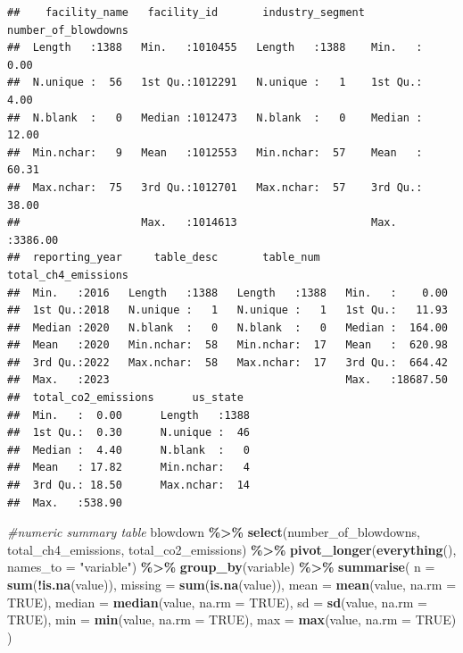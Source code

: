 \documentclass[
]{article}
\newenvironment{Shaded}{\begin{snugshade}}{\end{snugshade}}
\newcommand{\AttributeTok}[1]{\textcolor[rgb]{0.13,0.29,0.53}{#1}}
\newcommand{\CommentTok}[1]{\textcolor[rgb]{0.56,0.35,0.01}{\textit{#1}}}
\newcommand{\ConstantTok}[1]{\textcolor[rgb]{0.56,0.35,0.01}{#1}}
\newcommand{\FunctionTok}[1]{\textcolor[rgb]{0.13,0.29,0.53}{\textbf{#1}}}
\newcommand{\NormalTok}[1]{#1}
\newcommand{\SpecialCharTok}[1]{\textcolor[rgb]{0.81,0.36,0.00}{\textbf{#1}}}
\newcommand{\StringTok}[1]{\textcolor[rgb]{0.31,0.60,0.02}{#1}}
\begin{document}
\begin{verbatim}
##    facility_name   facility_id       industry_segment number_of_blowdowns
##  Length   :1388   Min.   :1010455   Length   :1388    Min.   :   0.00    
##  N.unique :  56   1st Qu.:1012291   N.unique :   1    1st Qu.:   4.00    
##  N.blank  :   0   Median :1012473   N.blank  :   0    Median :  12.00    
##  Min.nchar:   9   Mean   :1012553   Min.nchar:  57    Mean   :  60.31    
##  Max.nchar:  75   3rd Qu.:1012701   Max.nchar:  57    3rd Qu.:  38.00    
##                   Max.   :1014613                     Max.   :3386.00    
##  reporting_year     table_desc       table_num    total_ch4_emissions
##  Min.   :2016   Length   :1388   Length   :1388   Min.   :    0.00   
##  1st Qu.:2018   N.unique :   1   N.unique :   1   1st Qu.:   11.93   
##  Median :2020   N.blank  :   0   N.blank  :   0   Median :  164.00   
##  Mean   :2020   Min.nchar:  58   Min.nchar:  17   Mean   :  620.98   
##  3rd Qu.:2022   Max.nchar:  58   Max.nchar:  17   3rd Qu.:  664.42   
##  Max.   :2023                                     Max.   :18687.50   
##  total_co2_emissions      us_state   
##  Min.   :  0.00      Length   :1388  
##  1st Qu.:  0.30      N.unique :  46  
##  Median :  4.40      N.blank  :   0  
##  Mean   : 17.82      Min.nchar:   4  
##  3rd Qu.: 18.50      Max.nchar:  14  
##  Max.   :538.90
\end{verbatim}

\begin{Shaded}
\begin{Highlighting}[]
\CommentTok{\#numeric summary table}
\NormalTok{blowdown }\SpecialCharTok{\%\textgreater{}\%}
  \FunctionTok{select}\NormalTok{(number\_of\_blowdowns, total\_ch4\_emissions, total\_co2\_emissions) }\SpecialCharTok{\%\textgreater{}\%}
  \FunctionTok{pivot\_longer}\NormalTok{(}\FunctionTok{everything}\NormalTok{(), }\AttributeTok{names\_to =} \StringTok{"variable"}\NormalTok{) }\SpecialCharTok{\%\textgreater{}\%}
  \FunctionTok{group\_by}\NormalTok{(variable) }\SpecialCharTok{\%\textgreater{}\%}
  \FunctionTok{summarise}\NormalTok{(}
    \AttributeTok{n       =} \FunctionTok{sum}\NormalTok{(}\SpecialCharTok{!}\FunctionTok{is.na}\NormalTok{(value)),}
    \AttributeTok{missing =} \FunctionTok{sum}\NormalTok{(}\FunctionTok{is.na}\NormalTok{(value)),}
    \AttributeTok{mean    =} \FunctionTok{mean}\NormalTok{(value, }\AttributeTok{na.rm =} \ConstantTok{TRUE}\NormalTok{),}
    \AttributeTok{median  =} \FunctionTok{median}\NormalTok{(value, }\AttributeTok{na.rm =} \ConstantTok{TRUE}\NormalTok{),}
    \AttributeTok{sd      =} \FunctionTok{sd}\NormalTok{(value, }\AttributeTok{na.rm =} \ConstantTok{TRUE}\NormalTok{),}
    \AttributeTok{min     =} \FunctionTok{min}\NormalTok{(value, }\AttributeTok{na.rm =} \ConstantTok{TRUE}\NormalTok{),}
    \AttributeTok{max     =} \FunctionTok{max}\NormalTok{(value, }\AttributeTok{na.rm =} \ConstantTok{TRUE}\NormalTok{)}
\NormalTok{  )}
\end{Highlighting}
\end{Shaded}
\end{document}
